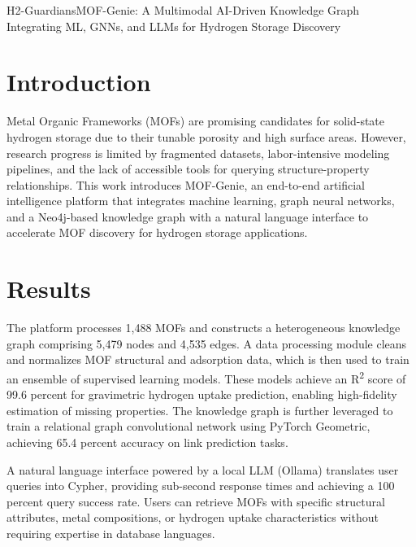\begin{teamsubmission}{H2-Guardians}{MOF-Genie: A Multimodal AI-Driven Knowledge Graph Integrating ML, GNNs, and LLMs for Hydrogen Storage Discovery}

\section*{Introduction}
Metal Organic Frameworks (MOFs) are promising candidates for solid-state hydrogen storage due to their tunable porosity and high surface areas. However, research progress is limited by fragmented datasets, labor-intensive modeling pipelines, and the lack of accessible tools for querying structure-property relationships. This work introduces MOF-Genie, an end-to-end artificial intelligence platform that integrates machine learning, graph neural networks, and a Neo4j-based knowledge graph with a natural language interface to accelerate MOF discovery for hydrogen storage applications.

\section*{Results}
The platform processes 1,488 MOFs and constructs a heterogeneous knowledge graph comprising 5,479 nodes and 4,535 edges. A data processing module cleans and normalizes MOF structural and adsorption data, which is then used to train an ensemble of supervised learning models. These models achieve an R\textsuperscript{2} score of 99.6 percent for gravimetric hydrogen uptake prediction, enabling high-fidelity estimation of missing properties. The knowledge graph is further leveraged to train a relational graph convolutional network using PyTorch Geometric, achieving 65.4 percent accuracy on link prediction tasks.

A natural language interface powered by a local LLM (Ollama) translates user queries into Cypher, providing sub-second response times and achieving a 100 percent query success rate. Users can retrieve MOFs with specific structural attributes, metal compositions, or hydrogen uptake characteristics without requiring expertise in database languages. 


\end{teamsubmission}

